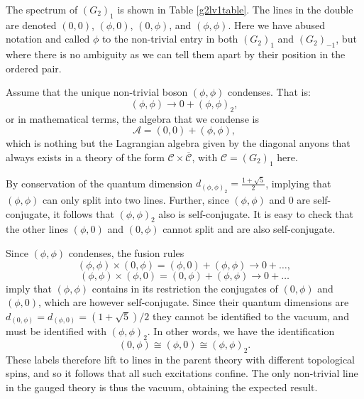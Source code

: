 \documentclass[11pt]{article}
\numberwithin{equation}{section}
\begin{document}
The spectrum of $(G_{2})_{1}$ is shown in Table \ref{g2lv1table}. The lines in the double are denoted $(0,0)$, $(\phi,0)$, $(0,\phi)$, and $(\phi, \phi)$. Here we have abused notation and called $\phi$ to the non-trivial entry in both $(G_{2})_{1}$ and $(G_{2})_{-1}$, but where there is no ambiguity as we can tell them apart by their position in the ordered pair. 

Assume that the unique non-trivial boson $(\phi,\phi)$ condenses. That is:
\begin{equation}
    (\phi, \phi) \longrightarrow 0 + (\phi, \phi)_{2},
\end{equation}
or in mathematical terms, the algebra that we condense is
\begin{equation}
    \mathcal{A} = (0,0) + (\phi,\phi),
\end{equation}
which is nothing but the Lagrangian algebra given by the diagonal anyons that always exists in a theory of the form $\mathcal{C} \times \overline{\mathcal{C}}$, with $\mathcal{C} = (G_{2})_{1}$ here.

By conservation of the quantum dimension $d_{(\phi, \phi)_{2}} = \frac{1+\sqrt{5}}{2}$, implying that $(\phi, \phi)$ can only split into two lines. Further, since $(\phi,\phi)$ and 0 are self-conjugate, it follows that $(\phi, \phi)_{2}$ also is self-conjugate. It is easy to check that the other lines $(\phi,0)$ and $(0,\phi)$ cannot split and are also self-conjugate.

Since $(\phi, \phi)$ condenses, the fusion rules
\begin{equation}
    (\phi, \phi) \times (0, \phi) = (\phi, 0) + (\phi, \phi) \longrightarrow 0 + \ldots,
\end{equation}
\begin{equation}
    (\phi, \phi) \times (\phi, 0) = (0, \phi) + (\phi, \phi) \longrightarrow 0 + \ldots
\end{equation}
imply that $(\phi, \phi)$ contains in its restriction the conjugates of $(0, \phi)$ and $(\phi, 0)$, which are however self-conjugate. Since their quantum dimensions are $d_{(0, \phi)} =  d_{(\phi, 0)} = (1+\sqrt{5})/2$ they cannot be identified to the vacuum, and must be identified with $(\phi, \phi)_{2}$. In other words, we have the identification
\begin{equation}
    (0, \phi) \cong (\phi,0) \cong (\phi, \phi)_{2}.
\end{equation}
These labels therefore lift to lines in the parent theory with different topological spins, and so it follows that all such excitations confine. The only non-trivial line in the gauged theory is thus the vacuum, obtaining the expected result.
\end{document}
